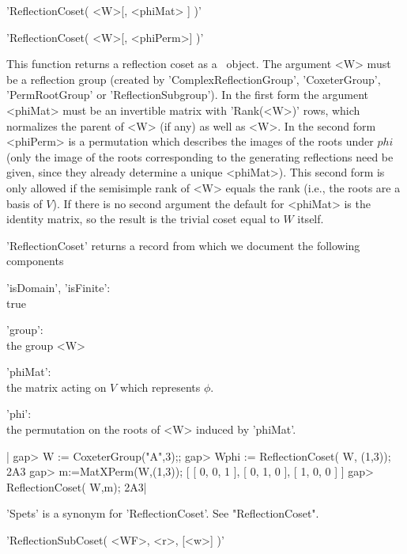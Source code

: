 
'ReflectionCoset( <W>[, <phiMat> ] )'

'ReflectionCoset( <W>[, <phiPerm>] )'

This  function returns a  reflection coset as  a \GAP\ object. The argument
<W>  must  be  a  reflection  group  (created  by 'ComplexReflectionGroup',
'CoxeterGroup', 'PermRootGroup' or 'ReflectionSubgroup'). In the first form
the  argument <phiMat> must be an  invertible matrix with 'Rank(<W>)' rows,
which  normalizes the parent of <W> (if any)  as well as <W>. In the second
form  <phiPerm> is  a permutation  which describes  the images of the roots
under  $phi$ (only the  image of the  roots corresponding to the generating
reflections need be given, since they already determine a unique <phiMat>).
This  second form is only allowed if  the semisimple rank of <W> equals the
rank  (i.e., the roots are a basis of  $V$). If there is no second argument
the  default for  <phiMat> is  the identity  matrix, so  the result  is the
trivial coset equal to $W$ itself.

'ReflectionCoset'  returns a  record from  which we  document the following
components\:

'isDomain', 'isFinite':\\
        true

'group':\\
        the group <W>

'phiMat':\\
        the matrix acting on $V$ which represents $\phi$.

'phi':\\
        the permutation on the roots of <W> induced by 'phiMat'.

|    gap> W := CoxeterGroup("A",3);;
    gap> Wphi := ReflectionCoset( W, (1,3));
    2A3
    gap> m:=MatXPerm(W,(1,3));
    [ [ 0, 0, 1 ], [ 0, 1, 0 ], [ 1, 0, 0 ] ]
    gap> ReflectionCoset( W,m);
    2A3|


'Spets' is a synonym for 'ReflectionCoset'. See "ReflectionCoset".


'ReflectionSubCoset( <WF>, <r>, [<w>] )'

